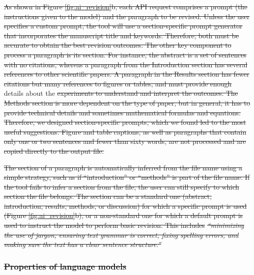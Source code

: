\documentclass[
]{article}
\providecommand{\DIFaddtex}[1]{{\protect\color{blue}\uwave{#1}}} %
\providecommand{\DIFdeltex}[1]{{\protect\color{red}\sout{#1}}}                      %
\providecommand{\DIFaddbegin}{} %
\providecommand{\DIFaddend}{} %
\providecommand{\DIFdelbegin}{} %
\providecommand{\DIFdelend}{} %
\providecommand{\DIFadd}[1]{\texorpdfstring{\DIFaddtex{#1}}{#1}} %
\providecommand{\DIFdel}[1]{\texorpdfstring{\DIFdeltex{#1}}{}} %
\newcommand{\DIFscaledelfig}{0.5}
\newlength{\DIFdelgraphicswidth} %
\newlength{\DIFdelgraphicsheight} %
\newcommand{\DIFaddincludegraphics}[2][]{{\color{blue}\fbox{\DIFOincludegraphics[#1]{#2}}}} %
\newcommand{\DIFdelincludegraphics}[2][]{%
\sbox{\DIFdelgraphicsbox}{\DIFOincludegraphics[#1]{#2}}%
\settoboxwidth{\DIFdelgraphicswidth}{\DIFdelgraphicsbox} %
\settoboxtotalheight{\DIFdelgraphicsheight}{\DIFdelgraphicsbox} %
\scalebox{\DIFscaledelfig}{%
\parbox[b]{\DIFdelgraphicswidth}{\usebox{\DIFdelgraphicsbox}\\[-\baselineskip] \rule{\DIFdelgraphicswidth}{0em}}\llap{\resizebox{\DIFdelgraphicswidth}{\DIFdelgraphicsheight}{%
\setlength{\unitlength}{\DIFdelgraphicswidth}%
\begin{picture}(1,1)%
\thicklines\linethickness{2pt} %
{\color[rgb]{1,0,0}\put(0,0){\framebox(1,1){}}}%
{\color[rgb]{1,0,0}\put(0,0){\line( 1,1){1}}}%
{\color[rgb]{1,0,0}\put(0,1){\line(1,-1){1}}}%
\end{picture}%
}\hspace*{3pt}}} %
} %
\DeclareRobustCommand{\DIFaddbegin}{\DIFOaddbegin \let\includegraphics\DIFaddincludegraphics} %
\DeclareRobustCommand{\DIFaddend}{\DIFOaddend \let\includegraphics\DIFOincludegraphics} %
\DeclareRobustCommand{\DIFdelbegin}{\DIFOdelbegin \let\includegraphics\DIFdelincludegraphics} %
\DeclareRobustCommand{\DIFdelend}{\DIFOaddend \let\includegraphics\DIFOincludegraphics} %
\begin{document}
\DIFdel{As shown in Figure \ref{fig:ai_revision}b, each API request comprises a prompt (the instructions given to the model) and the paragraph to be revised.
Unless the user specifies a custom prompt, the tool will use a section-specific prompt generator that incorporates the manuscript title and keywords.
Therefore, both must be accurate to obtain the best revision outcomes.
The other key component to process a paragraph is its section.
For instance, the abstract is a set of sentences with no citations, whereas a paragraph from the Introduction section has several references to other scientific papers.
A paragraph in the Results section has fewer citations but many references to figures or tables, and must provide enough }\DIFdelend \DIFaddbegin \DIFadd{More }\DIFaddend details about the \DIFdelbegin \DIFdel{experiments to understand and interpret the outcomes.
The Methods section is more dependent on the type of paper, but in general, it has to provide technical details and sometimes mathematical formulas and equations.
Therefore, we designed section-specific prompts, which we found led to the most useful suggestions.
Figure and table captions, as well as paragraphs that contain only one or two sentences and fewer than sixty words, are not processed and are copied directly to the output file.
}%

\DIFdel{The section of a paragraph is automatically inferred from the file name using a simple strategy, such as if ``introduction'' or ``methods'' is part of the file name.
If the tool fails to infer a section from the file, the user can still specify to which section the file belongs.
The section can be a standard one (abstract, introduction, results, methods, or discussion) for which a specific prompt is used (Figure \ref{fig:ai_revision}b), or a non-standard one for which a default prompt is used to instruct the model to perform basic revision.
This includes }\emph{\DIFdel{``minimizing the use of jargon, ensuring text grammar is correct, fixing spelling errors, and making sure the text has a clear sentence structure.''}}

\subsubsection{\DIFdel{Properties of language models}}
\addtocounter{subsubsection}{-1}%
\end{document}
